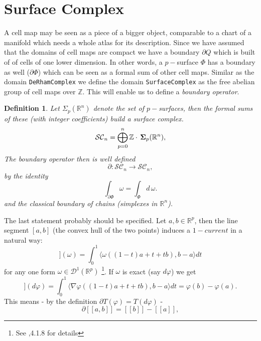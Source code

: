 \documentclass[12pt,a4paper]{article}
\newcommand{\RR}[1]{\mathbb{R}^{#1}}
\newtheorem{definition}{Definition}
\begin{document}
\section{Surface Complex}
A cell map may be seen as a piece of a bigger object, comparable to 
a chart of a manifold which needs a whole atlas for its description.
Since we have assumed that the domains of cell maps are compact we
have a boundary $\partial Q$ which is built of of cells of one 
lower dimension. In other words, a $p-$surface $\Phi$ has a boundary
as well ($\partial \Phi$) which can be seen as a formal sum of other
cell maps. Similar as the domain {\tt DeRhamComplex} we define the
domain {\tt SurfaceComplex} as the free abelian group of cell maps
over $\mathbb{Z}$. This will enable us to define a 
{\em boundary operator}.
\begin{definition}
Let $\Sigma_p({\RR n})$ denote the set of $p-$surfaces, then 
the formal sums of these (with integer coefficients) build a
surface complex.
 \begin{displaymath}
  \mathcal{SC}_n=\bigoplus_{p=0}^n \mathbb{Z}\cdot\,{\bf\Sigma}_p ({\RR n}),
 \end{displaymath}
The boundary operator then is well defined
 \begin{displaymath}
   \partial: \mathcal{SC}_n \rightarrow \mathcal{SC}_n,
 \end{displaymath}
by the identity
  \begin{displaymath}
       \int_{\partial \Phi} \omega = \int_{\Phi} d\,\omega.
  \end{displaymath}
and the classical boundary of chains (simplexes in $\RR n$).
\end{definition}
The last statement probably should be specified. Let $a,b\in\RR p$, 
then the line segment $[a,b]$ (the convex hull of the two points)
induces a $1-current$ in a natural way:
\begin{displaymath}
   [[a,b]](\omega) = \int_0^1 \langle \omega((1-t)a+t + t b),b-a\rangle dt
\end{displaymath} 
for any one form $\omega\in\mathcal{D}^1({\RR p})$
\footnote{See \cite{GMT},4.1.8 for details}. If $\omega$ is exact 
(say $d\varphi$) we get
\begin{displaymath}
   [[a,b]](d\varphi) = 
     \int_0^1 \langle \nabla\varphi((1-t)a+t + t b),b-a\rangle dt =
     \varphi(b) -\varphi(a).
\end{displaymath}
This means - by the definition $\partial T(\varphi)=T(d\varphi)$ -
\begin{displaymath}
  \partial [[a,b]] = [[b]] - [[a]],
\end{displaymath}
\end{document}
